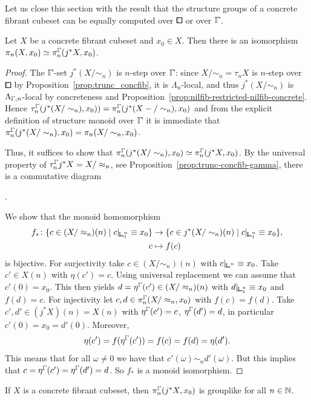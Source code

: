 Let us close this section with the result that the structure groups of a concrete fibrant cubeset
can be equally computed over $\bbox$ or over $\bbGamma$.

\begin{proposition}
Let $X$ be a concrete fibrant cubeset and $x_0\in X$.
Then there is an isomorphism $\pi_n(X,x_0)\simeq\pi_n^{\bbGamma}(j^\ast X,x_0)$.
\end{proposition}

\begin{proof}
The $\bbGamma$-set $j^\ast(X/\sim_n)$ is $n$-step over $\bbGamma$:
since $X/\sim_n = \tau_n X$ is $n$-step over $\bbox$ by Proposition~\ref{prop:trunc_concfib},
it is $\Lambda_n$-local, and thus $j^\ast(X/\sim_n)$ is $\Lambda_{\bbGamma,n}$-local by concreteness
and Proposition~\ref{prop:nilfib-restricted-nilfib-concrete}.
Hence $\tau_n^{\bbGamma}(j^\ast(X/\sim_n),x_0)) = \pi_n^{\bbGamma}(j^\ast(X-/\sim_n),x_0)$
and from the explicit definition of structure monoid over $\bbGamma$
it is immediate that $\pi_n^{\bbGamma}(j^\ast(X/\sim_n),x_0) = \pi_n(X/\sim_n,x_0)$.

Thus, it suffices to show that
$\pi_n^{\bbGamma}(j^\ast(X/\sim_n),x_0)\simeq\pi_n^{\bbGamma}(j^\ast X,x_0)$.
By the universal property of $\tau_n^{\bbGamma}j^\ast X = X/\approx_n$,
see Proposition~\ref{prop:trunc-concfib-gamma}, there is a commutative diagram
\begin{center}
.
\end{center}
We show that the monoid homomorphism
\begin{align*}
    f_\ast\colon\{c\in (X/\approx_n)(n) \mid c\rvert_{{\bbcor}^n_1}\equiv x_0 \}
    &\to\{c\in j^\ast(X/\sim_n)(n) \mid c\rvert_{{\bbcor}^n_1}\equiv x_0 \}, \\
    c&\mapsto f(c)
\end{align*}
is bijective.
For surjectivity take $c\in(X/\sim_n)(n)$ with $c\rvert_{{\bbcor}^n}\equiv x_0$.
Take $c'\in X(n)$ with $\eta(c') = c$.
Using universal replacement we can assume that $c'(0) = x_0$.
This then yields $d = \eta^{\bbGamma}(c') \in (X/\approx_n)(n)$ with $d\rvert_{{\bbcor}^n_1}\equiv x_0$
and $f(d) = c$.
For injectivity let $c,d\in\pi_n^{\bbGamma}(X/\approx_n,x_0)$ with $f(c) = f(d)$.
Take $c',d'\in (j^\ast X)(n) = X(n)$ with $\eta^{\bbGamma}(c') = c$, $\eta^{\bbGamma}(d') = d$,
in particular $c'(0) = x_0 = d'(0)$.
Moreover,
\[
    \eta(c') = f(\eta^{\bbGamma}(c')) = f(c) = f(d) = \eta(d').
\]
This means that for all $\omega\neq 0$ we have that $c'(\omega) \sim_n d'(\omega)$.
But this implies that $c = \eta^{\bbGamma}(c') = \eta^{\bbGamma}(d') = d$.
So $f_\ast$ is a monoid isomorphism.
\end{proof}

\begin{corollary}
If $X$ is a concrete fibrant cubeset, then $\pi_n^{\bbGamma}(j^\ast X,x_0)$ is grouplike for all $n\in{\mathbb{N}}$.
\end{corollary}
